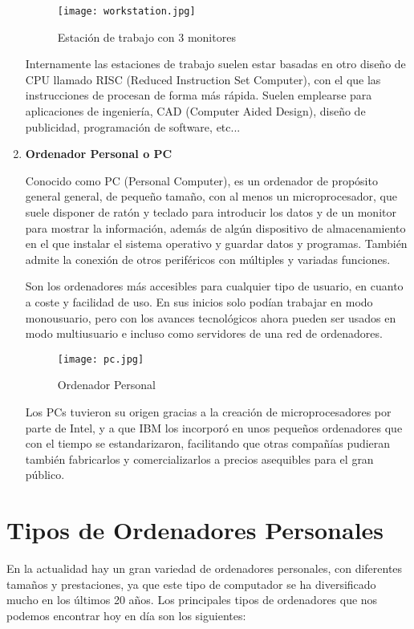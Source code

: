 \begin{enumerate}
    \begin{figure}[ht]
        \centering
        \texttt{[image: workstation.jpg]}
        \caption{Estación de trabajo con 3 monitores}
    \end{figure}

    Internamente las estaciones de trabajo suelen estar basadas en otro diseño de CPU llamado RISC (Reduced Instruction Set Computer), con el que las instrucciones de procesan de forma más rápida. Suelen emplearse para aplicaciones de ingeniería, CAD (Computer Aided Design), diseño de publicidad, programación de software, etc...

    \item \textbf{Ordenador Personal o PC}

    Conocido como PC (Personal Computer), es un ordenador de propósito general general, de pequeño tamaño, con al menos un microprocesador, que suele disponer de ratón y teclado para introducir los datos y de un monitor para mostrar la información, además de algún dispositivo de almacenamiento en el que instalar el sistema operativo y guardar datos y programas. También admite la conexión de otros periféricos con múltiples y variadas funciones.

    Son los ordenadores más accesibles para cualquier tipo de usuario, en cuanto a coste y facilidad de uso. En sus inicios solo podían trabajar en modo monousuario, pero con los avances tecnológicos ahora pueden ser usados en modo multiusuario e incluso como servidores de una red de ordenadores.

        \begin{figure}[ht]
        \centering
        \texttt{[image: pc.jpg]}
        \caption{Ordenador Personal}
    \end{figure}

    Los PCs tuvieron su origen gracias a la creación de microprocesadores por parte de Intel, y a que IBM los incorporó en unos pequeños ordenadores que con el tiempo se estandarizaron, facilitando que otras compañías pudieran también fabricarlos y comercializarlos a precios asequibles para el gran público.
\end{enumerate}

\section{Tipos de Ordenadores Personales}
En la actualidad hay un gran variedad de ordenadores personales, con diferentes tamaños	y prestaciones, ya que este tipo de computador se ha diversificado mucho en los últimos 20 años. Los principales tipos de ordenadores que nos podemos encontrar hoy en día son los siguientes:


